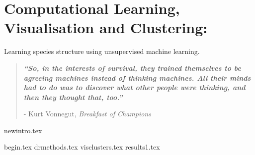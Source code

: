 

\chapter{ Computational Learning, Visualisation and Clustering:}
\vspace{-1cm} {\Large Learning species structure using unsupervised machine learning. } 


\blankpage
\restoregeometry
\vspace*{0.15\paperheight}


\begin{center}
\begin{quotation}
  \large{\emph{\textbf{``So, in the interests of survival, they trained themselves to be agreeing machines instead of thinking machines. All their minds had to do was to discover what other people were thinking, and then they thought that, too.''} }  }  \\
  \begin{flushright}
  - Kurt Vonnegut, \textit{Breakfast of Champions} 
  \end{flushright}
 \end{quotation}
\end{center}
\doublespacing
\newpage

%
{newintro.tex}

% 
 {begin.tex}
 {drmethods.tex}
{visclusters.tex}
{results1.tex}
% 
% 



\chapterbib






